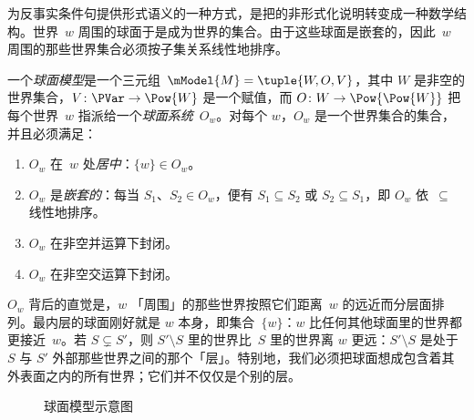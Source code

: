 \documentclass[../../../include/open-logic-section]{subfiles}
\begin{document}


为反事实条件句提供形式语义的一种方式，是把的非形式化说明转变成一种数学结构。世界~$w$ 周围的球面于是成为世界的集合。由于这些球面是嵌套的，因此~$w$ 周围的那些世界集合必须按子集关系线性地排序。

\begin{defn}
  一个\emph{球面模型}是一个三元组~$\mModel{M} = \tuple{W, O, V}$，其中 $W$ 是非空的世界集合，$V\colon \PVar \to \Pow{W}$ 是一个赋值，而 $O\colon W \to \Pow{\Pow{W}}$ 把每个世界~$w$ 指派给一个\emph{球面系统}~$O_w$。对每个 $w$，$O_w$ 是一个世界集合的集合，并且必须满足：
  \begin{enumerate}
  \item $O_w$ 在~$w$ 处\emph{居中}：$\{w\} \in O_w$。
  \item $O_w$ 是\emph{嵌套的}：每当 $S_1$、$S_2 \in O_w$，便有 $S_1 \subseteq S_2$ 或 $S_2 \subseteq S_1$，即 $O_w$ 依~$\subseteq$ 线性地排序。
  \item $O_w$ 在非空并运算下封闭。
  \item $O_w$ 在非空交运算下封闭。
  \end{enumerate}
\end{defn}

$O_w$ 背后的直觉是，$w$ 「周围」的那些世界按照它们距离~$w$ 的远近而分层面排列。最内层的球面刚好就是 $w$ 本身，即集合~$\{w\}$：$w$ 比任何其他球面里的世界都更接近~$w$。若 $S \subsetneq S'$，则 $S' \setminus S$ 里的世界比~$S$ 里的世界离 $w$ 更远：$S' \setminus S$ 是处于 $S$ 与 $S'$ 外部那些世界之间的那个「层」。特别地，我们必须把球面想成包含着其外表面之内的所有世界；它们并不仅仅是个别的层。

\begin{figure}
\begin{center}
\caption{球面模型示意图}
\end{center}
\end{figure}
\end{document}

